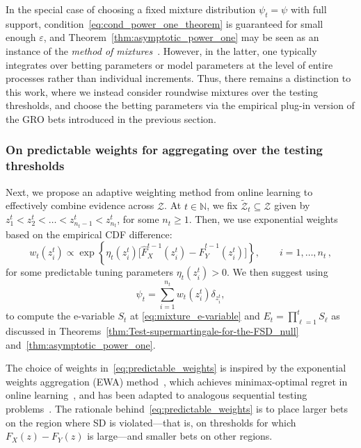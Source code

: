 \documentclass[12pt,twoside]{article}
\theoremstyle{plain}
\theoremstyle{definition}
\theoremstyle{remark}
\newcommand{\N}{\mathbb{N}}
\newcommand{\calZ}{\mathcal{Z}}
\begin{document}
In the special case of choosing a fixed mixture distribution $\psi_t=\psi$ with full support, condition~\eqref{eq:cond_power_one_theorem} is guaranteed for small enough $\varepsilon$, and Theorem~\ref{thm:asymptotic_power_one} may be seen as an instance of the \emph{method of mixtures}~\citep{robbins1970boundary,howard2021time}. 
However, in the latter, one typically integrates over betting parameters or model parameters at the level of entire processes rather than individual increments. Thus, there remains a distinction to this work, where we instead consider roundwise mixtures over the testing thresholds, and choose the betting parameters via the empirical plug-in version of the GRO bets introduced in the previous section.



\subsubsection{On predictable weights for aggregating over the testing thresholds}\label{sec:agg_over_z}


Next, we propose an adaptive weighting method from online learning to effectively combine evidence across $\calZ$. 
At $t\in \N$, we fix $\tilde{\calZ}_t\subseteq \calZ$ given by $z_1^t < z_2^t < \ldots < z^t_{n_t-1} <z_{n_t}^t$, 
for some $n_t\geq 1$. 
Then, we use exponential weights based on the empirical CDF difference: 
\begin{equation}\label{eq:predictable_weights}
    w_t(z_i^t) \propto \exp\left\{\eta_{t}(z_i^t)\big[\hat{F}_{X}^{t-1}(z_i^t)-\hat{F}_{Y}^{t-1}(z_i^t)\big]\right\}, \quad \quad i=1, \ldots, n_t\,,
\end{equation}
for some predictable tuning parameters $\eta_{t}(z_i^t)>0$. We then suggest using
\begin{equation}\label{eq:pred_mixture}
    \psi_t=\sum_{i=1}^{n_t}  w_t(z_i^t) \delta_{z_i^t}, 
\end{equation}
to compute the e-variable $S_t$ at \eqref{eq:mixture_e-variable} and $E_t=\prod_{\ell=1}^t S_\ell$ as discussed in Theorems~\ref{thm:Test-supermartingale-for-the-FSD_null} and~\ref{thm:asymptotic_power_one}.


The choice of weights in~\eqref{eq:predictable_weights} is inspired by the exponential weights aggregation (EWA) method~\citep{vovk1990aggregating}, which achieves minimax-optimal regret in online learning~\citep{cesabianchi2006prediction}, 
and has been adapted to analogous sequential testing problems~\citep[e.g.,][]{orabona2023tight,waudbysmith2020estimating,waudbysmith2025universal}.
The rationale behind~\eqref{eq:predictable_weights} is to place larger bets on the region where SD is violated—that is, on thresholds for which $F_X(z)-F_Y(z)$ is large—and smaller bets on other regions. 
\end{document}
